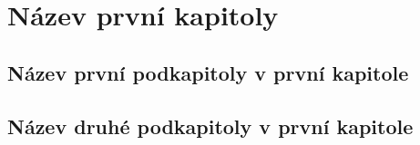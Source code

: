 \chapter{Název první kapitoly}

\section{Název první podkapitoly v první kapitole}

\section{Název druhé podkapitoly v první kapitole}

